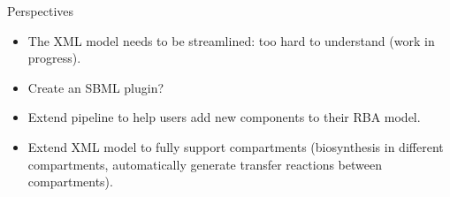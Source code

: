 \documentclass{beamer}
\begin{document}
\begin{frame}{Perspectives}
  \begin{itemize}
    \item The XML model needs to be streamlined:
    too hard to understand (work in progress).
    \item Create an SBML plugin?
    \item Extend pipeline to help users add new components to their RBA model.
    \item Extend XML model to fully support compartments (biosynthesis in
    different compartments, automatically generate transfer reactions between
    compartments).
  \end{itemize}
\end{frame}


\appendix
{}
\setcounter{finalframe}{\value{framenumber}}


\setcounter{framenumber}{\value{finalframe}}
\end{document}
